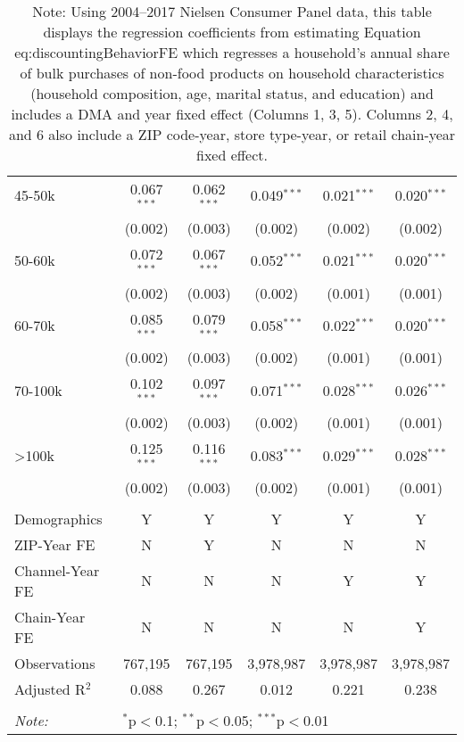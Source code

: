 \begin{table}[!htbp]
\begin{tabular}{@{\extracolsep{5pt}}lccccc}
  45-50k & 0.067$^{***}$ & 0.062$^{***}$ & 0.049$^{***}$ & 0.021$^{***}$ & 0.020$^{***}$ \\
  & (0.002) & (0.003) & (0.002) & (0.002) & (0.002) \\
  50-60k & 0.072$^{***}$ & 0.067$^{***}$ & 0.052$^{***}$ & 0.021$^{***}$ & 0.020$^{***}$ \\
  & (0.002) & (0.003) & (0.002) & (0.001) & (0.001) \\
  60-70k & 0.085$^{***}$ & 0.079$^{***}$ & 0.058$^{***}$ & 0.022$^{***}$ & 0.020$^{***}$ \\
  & (0.002) & (0.003) & (0.002) & (0.001) & (0.001) \\
  70-100k & 0.102$^{***}$ & 0.097$^{***}$ & 0.071$^{***}$ & 0.028$^{***}$ & 0.026$^{***}$ \\
  & (0.002) & (0.003) & (0.002) & (0.001) & (0.001) \\
  >100k & 0.125$^{***}$ & 0.116$^{***}$ & 0.083$^{***}$ & 0.029$^{***}$ & 0.028$^{***}$ \\
  & (0.002) & (0.003) & (0.002) & (0.001) & (0.001) \\
 \hline \\[-1.8ex]
Demographics & Y & Y & Y & Y & Y \\
ZIP-Year FE & N & Y & N & N & N \\
Channel-Year FE & N & N & N & Y & Y \\
Chain-Year FE & N & N & N & N & Y \\
Observations & 767,195 & 767,195 & 3,978,987 & 3,978,987 & 3,978,987 \\
Adjusted R$^{2}$ & 0.088 & 0.267 & 0.012 & 0.221 & 0.238 \\
\hline
\hline \\[-1.8ex]
\textit{Note:}  & \multicolumn{5}{l}{$^{*}$p$<$0.1; $^{**}$p$<$0.05; $^{***}$p$<$0.01} \\
\end{tabular}
\caption*{Note: Using 2004--2017 Nielsen Consumer Panel data, this table displays the regression coefficients from estimating Equation {eq:discountingBehaviorFE} which regresses a household's annual share of bulk purchases of non-food products on household characteristics (household composition, age, marital status, and education) and includes a DMA and year fixed effect (Columns 1, 3, 5). Columns 2, 4, and 6 also include a ZIP code-year, store type-year, or retail chain-year fixed effect.}
\end{table}
